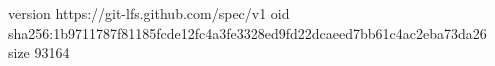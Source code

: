 version https://git-lfs.github.com/spec/v1
oid sha256:1b9711787f81185fcde12fc4a3fe3328ed9fd22dcaeed7bb61c4ac2eba73da26
size 93164
